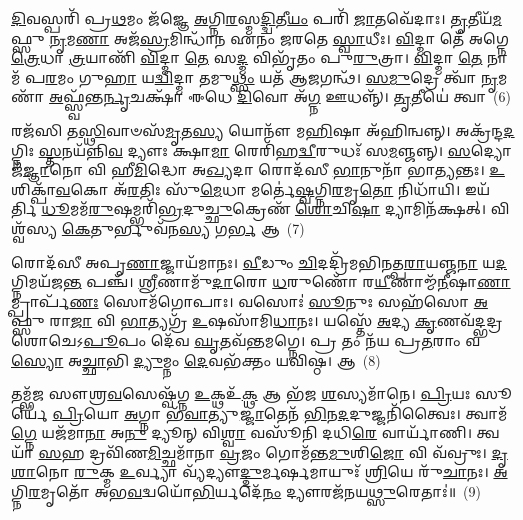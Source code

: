{\anuvakamend[{𑌦𑌿\-\ul{𑌵}\-𑌮\-\ul{𑌨𑍁} 𑌵𑌿 𑌕𑍍𑌰᳴𑌮\-\ul{𑌸𑍍𑌵} 𑌨𑌿𑌰𑍍𑌭᳴\-\ul{𑌕𑍍𑌤𑌃} 𑌸 𑌯𑌂 \ul{𑌦𑍍𑌵𑌿}\-𑌷𑍍𑌮𑍋 𑌵𑌿\-\ul{𑌷𑍍𑌣𑍋}\-𑌰𑍍𑌧\-\ul{𑌨𑍇}\-𑌨𑌾𑌗𑍍𑌨𑍇᳴\-𑌽\-\ul{𑌧}\-𑌮\-\ul{𑌮}\-𑌸𑍍𑌯𑌾𑌃 𑌶𑍁᳴\-\ul{𑌚𑌿}\-𑌷𑌥𑍍𑌷𑍋𑌡᳴𑌶 𑌚}]}%

\-\ul{𑌦𑌿}\-𑌵𑌸𑍍𑌪𑌰𑌿᳴ 𑌪𑍍𑌰\-\ul{𑌥}\-𑌮𑌂 𑌜᳴𑌜𑍍𑌞𑍇 \ul{𑌅}\-𑌗𑍍𑌨𑌿\-\ul{𑌰}\-𑌸𑍍𑌮\-\ul{𑌦𑍍𑌦𑍍𑌵𑌿}\-𑌤𑍀\-\ul{𑌯𑌂} 𑌪𑌰𑌿᳴ \ul{𑌜𑌾}\-𑌤𑌵𑍇᳴𑌦𑌾𑌃। \ul{𑌤𑍃}\-𑌤𑍀𑌯᳴\-\ul{𑌮}\-𑌫𑍍𑌸𑍁 \ul{𑌨𑍃}\-𑌮\-\ul{𑌣𑌾} 𑌅𑌜᳴\-\ul{𑌸𑍍𑌰}\-𑌮𑌿𑌨𑍍𑌧𑌾᳴𑌨 𑌏𑌨𑌂 𑌜𑌰𑌤𑍇 \ul{𑌸𑍍𑌵𑌾}\-𑌧𑍀𑌃। \ul{𑌵𑌿}\-𑌦𑍍𑌮𑌾 𑌤𑍇᳴ 𑌅𑌗𑍍𑌨𑍇 \ul{𑌤𑍍𑌰𑍇}\-𑌧𑌾 \ul{𑌤𑍍𑌰}\-𑌯𑌾𑌣𑌿᳴ \ul{𑌵𑌿}\-𑌦𑍍𑌮𑌾 \ul{𑌤𑍇} 𑌸\-\ul{𑌦𑍍𑌮} 𑌵𑌿𑌭𑍃᳴𑌤𑌂 𑌪𑍁\-\ul{𑌰𑍁}\-𑌤𑍍𑌰𑌾। \ul{𑌵𑌿}\-𑌦𑍍𑌮𑌾 \ul{𑌤𑍇} 𑌨𑌾𑌮᳴ 𑌪\-\ul{𑌰}\-𑌮𑌂 𑌗𑍁\-\ul{𑌹𑌾} 𑌯\-\ul{𑌦𑍍𑌵𑌿}\-𑌦𑍍𑌮𑌾 𑌤𑌮𑍁\-\ul{𑌥𑍍𑌸𑌂} 𑌯𑌤᳴ 𑌆\-\ul{𑌜}\-𑌗𑌨𑍍𑌥᳴। \ul{𑌸}\-\-\ul{𑌮𑍁}\-𑌦𑍍𑌰𑍇 𑌤𑍍𑌵𑌾᳴ \ul{𑌨𑍃}\-𑌮𑌣𑌾᳴ \ul{𑌅}\-𑌫𑍍𑌸𑍍𑌵᳴𑌨𑍍𑌤\-\ul{𑌰𑍍𑌨𑍃}\-𑌚𑌕𑍍𑌷𑌾᳴ 𑌈𑌧𑍇 \ul{𑌦𑌿}\-𑌵𑍋 𑌅᳴\-\ul{𑌗𑍍𑌨} 𑌊𑌧𑌨𑍍𑌨𑍍᳴। \ul{𑌤𑍃}\-𑌤𑍀𑌯𑍇॑ 𑌤𑍍𑌵𑌾~(6)

𑌰𑌜᳴𑌸𑌿 𑌤\-\ul{𑌸𑍍𑌥𑌿}\-𑌵𑌾𑍞𑌸᳴\-\ul{𑌮𑍃}\-𑌤\-\ul{𑌸𑍍𑌯} 𑌯𑍋𑌨𑍗᳴ 𑌮\-\ul{𑌹𑌿}\-𑌷𑌾 𑌅᳴𑌹𑌿𑌨𑍍𑌵𑌨𑍍𑌨𑍍। 𑌅𑌕𑍍𑌰᳴𑌨𑍍𑌦\-\ul{𑌦}\-𑌗𑍍𑌨𑌿𑌃 \ul{𑌸𑍍𑌤}\-𑌨𑌯᳴𑌨𑍍𑌨𑌿\-\ul{𑌵} 𑌦𑍍𑌯𑍗𑌃 𑌕𑍍𑌷𑌾\-\ul{𑌮𑌾} 𑌰𑍇𑌰𑌿᳴𑌹\-\ul{𑌦𑍍𑌵𑍀}\-𑌰𑍁𑌧𑌃᳴ 𑌸\-\ul{𑌮}\-𑌞𑍍𑌜𑌨𑍍𑌨𑍍। \ul{𑌸}\-𑌦𑍍𑌯𑍋 𑌜᳴\-\ul{𑌜𑍍𑌞𑌾}\-𑌨𑍋 𑌵𑌿 𑌹𑍀\-\ul{𑌮𑌿}\-𑌦𑍍𑌧𑍋 𑌅\-\ul{𑌖𑍍𑌯}\-𑌦𑌾 𑌰𑍋𑌦᳴𑌸𑍀 \ul{𑌭𑌾}\-𑌨𑍁𑌨𑌾᳴ 𑌭𑌾\-\ul{𑌤𑍍𑌯}\-𑌨𑍍𑌤𑌃। \ul{𑌉}\-𑌶𑌿𑌕𑍍𑌪𑌾᳴\-\ul{𑌵}\-𑌕𑍋 𑌅᳴\-\ul{𑌰}\-𑌤𑌿𑌃 𑌸𑍁᳴\-\ul{𑌮𑍇}\-𑌧𑌾 𑌮𑌰𑍍𑌤𑍇॑\-\ul{𑌷𑍍𑌵}\-𑌗𑍍𑌨𑌿\-\ul{𑌰}\-𑌮𑍃\-\ul{𑌤𑍋} 𑌨𑌿𑌧𑌾᳴𑌯𑌿। 𑌇𑌯᳴𑌰𑍍𑌤𑌿 \ul{𑌧𑍂}\-𑌮𑌮᳴\-\ul{𑌰𑍁}\-𑌷𑌮𑍍𑌭𑌰𑌿᳴\-\ul{𑌭𑍍𑌰}\-𑌦𑍁\-\ul{𑌚𑍍𑌛𑍁}\-𑌕𑍍𑌰𑍇𑌣᳴ \ul{𑌶𑍋}\-𑌚𑌿\-\ul{𑌷𑌾} 𑌦𑍍𑌯𑌾𑌮𑌿𑌨᳴𑌕𑍍𑌷𑌤𑍍। 𑌵𑌿𑌶𑍍𑌵᳴𑌸𑍍𑌯 \ul{𑌕𑍇}\-𑌤𑍁𑌰𑍍𑌭𑍁𑌵᳴𑌨\-\ul{𑌸𑍍𑌯} 𑌗\-\ul{𑌰𑍍𑌭} 𑌆~(7)

𑌰𑍋𑌦᳴𑌸𑍀 𑌅𑌪𑍃\-\ul{𑌣𑌾}\-𑌜𑍍𑌜𑌾𑌯᳴𑌮𑌾𑌨𑌃। \ul{𑌵𑍀}\-𑌡𑍁𑌂 \ul{𑌚𑌿}\-𑌦𑌦𑍍𑌰𑌿᳴𑌮𑌭𑌿𑌨𑌤𑍍𑌪\-\ul{𑌰𑌾}\-𑌯𑌞𑍍𑌜\-\ul{𑌨𑌾} 𑌯\-\ul{𑌦}\-𑌗𑍍𑌨𑌿𑌮𑌯᳴𑌜\-\ul{𑌨𑍍𑌤} 𑌪𑌞𑍍𑌚᳴। \ul{𑌶𑍍𑌰𑍀}\-𑌣𑌾𑌮𑍁᳴\-\ul{𑌦𑌾}\-𑌰𑍋 \ul{𑌧}\-𑌰𑍁𑌣𑍋᳴ 𑌰\-\ul{𑌯𑍀}\-𑌣𑌾𑌮𑍍𑌮᳴\-\ul{𑌨𑍀}\-𑌷𑌾\-\ul{𑌣𑌾}\-𑌮𑍍𑌪𑍍𑌰𑌾𑌰𑍍𑌪᳴\-\ul{𑌣𑌃} 𑌸𑍋𑌮᳴𑌗𑍋𑌪𑌾𑌃। 𑌵𑌸𑍋𑌃॑ \ul{𑌸𑍂}\-𑌨𑍁𑌃 𑌸𑌹᳴𑌸𑍋 \ul{𑌅}\-𑌫𑍍𑌸𑍁 𑌰𑌾\-\ul{𑌜𑌾} 𑌵𑌿 \ul{𑌭𑌾}\-𑌤𑍍𑌯𑌗𑍍𑌰᳴ \ul{𑌉}\-𑌷𑌸𑌾᳴𑌮𑌿\-\ul{𑌧𑌾}\-𑌨𑌃। 𑌯𑌸𑍍𑌤𑍇᳴ \ul{𑌅}\-𑌦𑍍𑌯 \ul{𑌕𑍃}\-𑌣𑌵᳴𑌦𑍍𑌭𑌦𑍍𑌰𑌶𑍋𑌚𑍇\-𑌽\-\ul{𑌪𑍂}\-𑌪𑌂 𑌦𑍇᳴𑌵 \ul{𑌘𑍃}\-𑌤𑌵᳴𑌨𑍍𑌤𑌮𑌗𑍍𑌨𑍇। 𑌪𑍍𑌰 𑌤𑌂 𑌨᳴𑌯 𑌪𑍍𑌰\-\ul{𑌤}\-𑌰𑌾𑌂 𑌵\-\ul{𑌸𑍍𑌯𑍋} 𑌅\-\ul{𑌚𑍍𑌛𑌾}\-𑌭𑌿 \ul{𑌦𑍍𑌯𑍁}\-𑌮𑍍𑌨𑌂 \ul{𑌦𑍇}\-𑌵𑌭᳴𑌕𑍍𑌤𑌂 𑌯𑌵𑌿𑌷𑍍𑌠। 𑌆~(8)

𑌤𑌮𑍍𑌭᳴𑌜 𑌸𑍗𑌶𑍍𑌰\-\ul{𑌵}\-𑌸𑍇𑌷𑍍𑌵᳴𑌗𑍍𑌨 \ul{𑌉}\-𑌕𑍍𑌥𑌉᳴\-\ul{𑌕𑍍𑌥} 𑌆 𑌭᳴𑌜 \ul{𑌶}\-𑌸𑍍𑌯𑌮𑌾᳴𑌨𑍇। \ul{𑌪𑍍𑌰𑌿}\-𑌯𑌃 𑌸𑍂𑌰𑍍𑌯𑍇॑ \ul{𑌪𑍍𑌰𑌿}\-𑌯𑍋 \ul{𑌅}\-𑌗𑍍𑌨𑌾 𑌭᳴\-\ul{𑌵𑌾}\-𑌤𑍍𑌯𑍁\-\ul{𑌜𑍍𑌜𑌾}\-𑌤𑍇𑌨᳴ \ul{𑌭𑌿}\-𑌨\-\ul{𑌦}\-𑌦𑍁𑌜𑍍𑌜𑌨𑌿᳴𑌤𑍍𑌵𑍈𑌃। 𑌤𑍍𑌵𑌾𑌮᳴\-\ul{𑌗𑍍𑌨𑍇} 𑌯𑌜᳴𑌮𑌾\-\ul{𑌨𑌾} 𑌅\-\ul{𑌨𑍁} 𑌦𑍍𑌯𑍂𑌨𑍍 𑌵𑌿\-\ul{𑌶𑍍𑌵𑌾} 𑌵𑌸𑍂᳴𑌨𑌿 𑌦𑌧𑌿\-\ul{𑌰𑍇} 𑌵𑌾𑌰𑍍𑌯𑌾᳴𑌣𑌿। 𑌤𑍍𑌵𑌯𑌾᳴ \ul{𑌸}\-𑌹 𑌦𑍍𑌰𑌵𑌿᳴𑌣\-\ul{𑌮𑌿}\-𑌚𑍍𑌛𑌮𑌾᳴𑌨𑌾 \ul{𑌵𑍍𑌰}\-𑌜𑌂 𑌗𑍋𑌮᳴𑌨𑍍𑌤\-\ul{𑌮𑍁}\-𑌶𑌿\-\ul{𑌜𑍋} 𑌵𑌿 𑌵᳴𑌵𑍍𑌰𑍁𑌃। \ul{𑌦𑍃}\-\-\ul{𑌶𑌾}\-𑌨𑍋 \ul{𑌰𑍁}\-𑌕𑍍𑌮 \ul{𑌉}\-𑌰𑍍𑌵𑍍𑌯𑌾 𑌵𑍍𑌯᳴𑌦𑍍𑌯𑍗\-\ul{𑌦𑍍𑌦𑍁}\-𑌰𑍍𑌮𑌰𑍍\mbox{}\-\ul{𑌷}\-𑌮𑌾𑌯𑍁𑌃᳴ \ul{𑌶𑍍𑌰𑌿}\-𑌯𑍇 𑌰𑍁᳴\-\ul{𑌚𑌾}\-𑌨𑌃। \ul{𑌅}\-𑌗𑍍𑌨𑌿\-\ul{𑌰}\-𑌮𑍃𑌤𑍋᳴ 𑌅𑌭\-\ul{𑌵}\-𑌦𑍍𑌵𑌯𑍋᳴\-\ul{𑌭𑌿}\-𑌰𑍍𑌯𑌦𑍇᳴\-\ul{𑌨𑌂} 𑌦𑍍𑌯𑍗𑌰𑌜᳴𑌨𑌯\-\ul{𑌥𑍍𑌸𑍁}\-𑌰𑍇𑌤𑌾𑌃॑॥~(9)

